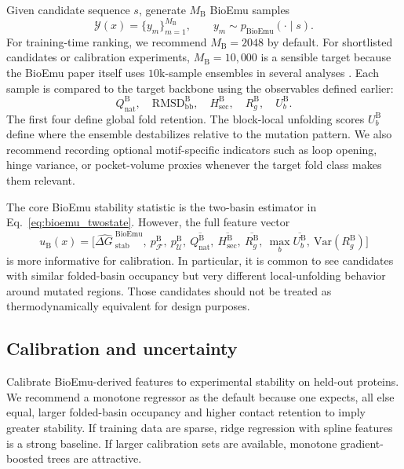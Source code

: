 \documentclass[11pt]{article}
\newcommand{\dG}{\ensuremath{\Delta G \ }}
\begin{document}
Given candidate sequence $s$, generate $M_{\mathrm B}$ BioEmu samples
\[
\mathcal{Y}(x)=\{y_m\}_{m=1}^{M_{\mathrm B}}, \qquad y_m \sim p_{\mathrm{BioEmu}}(\cdot\mid s).
\]
For training-time ranking, we recommend $M_{\mathrm B}=2048$ by default. For shortlisted candidates or calibration experiments, $M_{\mathrm B}=10{,}000$ is a sensible target because the BioEmu paper itself uses $10$k-sample ensembles in several analyses \citep{lewis2024bioemu}. Each sample is compared to the target backbone using the observables defined earlier:
\[
Q_{\mathrm{nat}}^{\mathrm B},\quad \mathrm{RMSD}_{\mathrm{bb}}^{\mathrm B},\quad H_{\mathrm{sec}}^{\mathrm B},\quad R_g^{\mathrm B},\quad U_b^{\mathrm B}.
\]
The first four define global fold retention. The block-local unfolding scores $U_b^{\mathrm B}$ define where the ensemble destabilizes relative to the mutation pattern. We also recommend recording optional motif-specific indicators such as loop opening, hinge variance, or pocket-volume proxies whenever the target fold class makes them relevant.

The core BioEmu stability statistic is the two-basin estimator in Eq.~\eqref{eq:bioemu_twostate}. However, the full feature vector
\[
u_{\mathrm B}(x)=\Big[\widehat{\dG}^{\mathrm{BioEmu}}_{\mathrm{stab}},\ p_{\mathcal F}^{\mathrm B},\ p_{\mathcal U}^{\mathrm B},\ \overline{Q_{\mathrm{nat}}^{\mathrm B}},\ \overline{H_{\mathrm{sec}}^{\mathrm B}},\ \overline{R_g^{\mathrm B}},\ \max_b \overline{U_b^{\mathrm B}},\ \mathrm{Var}(R_g^{\mathrm B})\Big]
\]
is more informative for calibration. In particular, it is common to see candidates with similar folded-basin occupancy but very different local-unfolding behavior around mutated regions. Those candidates should not be treated as thermodynamically equivalent for design purposes.

\subsection{Calibration and uncertainty}

Calibrate BioEmu-derived features to experimental stability on held-out proteins. We recommend a monotone regressor as the default because one expects, all else equal, larger folded-basin occupancy and higher contact retention to imply greater stability. If training data are sparse, ridge regression with spline features is a strong baseline. If larger calibration sets are available, monotone gradient-boosted trees are attractive.
\end{document}
